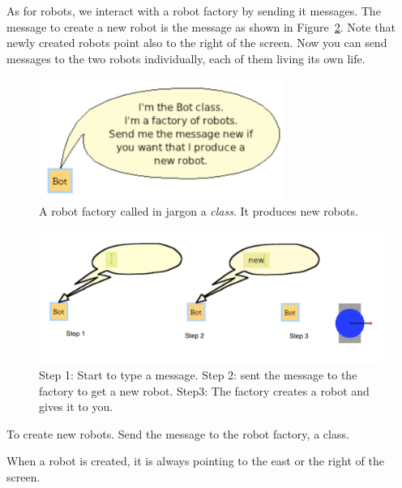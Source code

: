 As for robots, we interact with a robot factory by sending it messages. The message to create a new robot is the message  as shown in Figure~\ref{fig:turtleBoxNew}. 
Note that newly created robots point also to the right of the screen. Now you can send messages to the two robots individually, each of them living its own life. 

\begin{figure}[!h]\centerline{\includegraphics[width=8cm]{classBalloon2}}
\caption{A robot factory called in \sq jargon a \emph{class}. It produces new robots. \label{fig:classBalloon}}
\end{figure}

\begin{figure}[!h]\centerline{\includegraphics[width=14cm]{creatingARobot2}}
\caption{Step 1: Start to type a message. Step 2: sent the message  to the factory to get a new robot. Step3: The factory creates a robot and gives it to you.\label{fig:turtleBoxNew}}
\end{figure}

\begin{largecadre}{To create new robots. Send the message  to the robot factory, a class.}
\end{largecadre}

When a robot is created, it is always pointing to the east or the right of the screen. 



